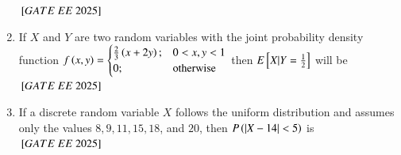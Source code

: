 \documentclass[journal,12pt,onecolumn]{IEEEtran}
\theoremstyle{remark}
\begin{document}
\begin{enumerate}
\vspace{0.2cm}
\hfill $\sbrak{GATE\ EE\ 2025}$
\begin{enumerate}
\end{enumerate}
 
\item If $X$ and $Y$ are two random variables with the joint probability density function
$
f \left(x, y\right) =
\begin{cases}
\frac{2}{3} \left(x + 2y\right); & 0 < x, y < 1 \\
0; & \text{otherwise}
\end{cases}
$
then $E{}\left[X|Y=\frac{1}{2}\right]$ will be
\hfill $\sbrak{GATE\ EE\ 2025}$
\begin{enumerate}
\end{enumerate}
 
\item If a discrete random variable $X$ follows the uniform distribution and assumes only the values $8, 9, 11, 15, 18$, and $20$, then $P \left(|X - 14| < 5\right)$ is
\hfill $\sbrak{GATE\ EE\ 2025}$
\begin{enumerate}
\end{enumerate}
 

\end{enumerate}
\end{document}

